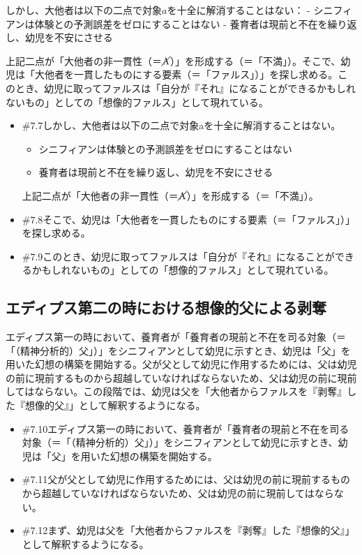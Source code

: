 しかし、大他者は以下の二点で対象\(a\)を十全に解消することはない： -
シニフィアンは体験との予測誤差をゼロにすることはない -
養育者は現前と不在を繰り返し、幼児を不安にさせる

上記二点が「大他者の非一貫性（＝\(\cancel{\textrm{A}}\)）」を形成する（＝「不満」）。そこで、幼児は「大他者を一貫したものにする要素（＝「ファルス」）」を探し求める。このとき、幼児に取ってファルスは「自分が『それ』になることができるかもしれないもの」としての「想像的ファルス」として現れている。

\begin{note}{}
  \begin{itemize}
    \tightlist
    \item{\#7.7}しかし、大他者は以下の二点で対象aを十全に解消することはない。
      \begin{itemize}
        \tightlist
        \item シニフィアンは体験との予測誤差をゼロにすることはない
        \item 養育者は現前と不在を繰り返し、幼児を不安にさせる
      \end{itemize}上記二点が「大他者の非一貫性（＝$\cancel{\textrm{A}}$）」を形成する（＝「不満」）。
    \item{\#7.8}そこで、幼児は「大他者を一貫したものにする要素（＝「ファルス」）」を探し求める。
    \item{\#7.9}このとき、幼児に取ってファルスは「自分が『それ』になることができるかもしれないもの」としての「想像的ファルス」として現れている。
  \end{itemize}
\end{note}

\subsection{エディプス第二の時における想像的父による剥奪}\label{ux30a8ux30c7ux30a3ux30d7ux30b9ux7b2cux4e8cux306eux6642ux306bux304aux3051ux308bux60f3ux50cfux7684ux7236ux306bux3088ux308bux5265ux596a}

エディプス第一の時において、養育者が「養育者の現前と不在を司る対象（＝「（精神分析的）父」）」をシニフィアンとして幼児に示すとき、幼児は「父」を用いた幻想の構築を開始する。父が父として幼児に作用するためには、父は幼児の前に現前するものから超越していなければならないため、父は幼児の前に現前してはならない。この段階では、幼児は父を「大他者からファルスを『剥奪』した『想像的父』」として解釈するようになる。

\begin{note}{}
  \begin{itemize}
    \tightlist
    \item{\#7.10}エディプス第一の時において、養育者が「養育者の現前と不在を司る対象（＝「（精神分析的）父」）」をシニフィアンとして幼児に示すとき、幼児は「父」を用いた幻想の構築を開始する。
    \item{\#7.11}父が父として幼児に作用するためには、父は幼児の前に現前するものから超越していなければならないため、父は幼児の前に現前してはならない。
    \item{\#7.12}まず、幼児は父を「大他者からファルスを『剥奪』した『想像的父』」として解釈するようになる。
  \end{itemize}
\end{note}

